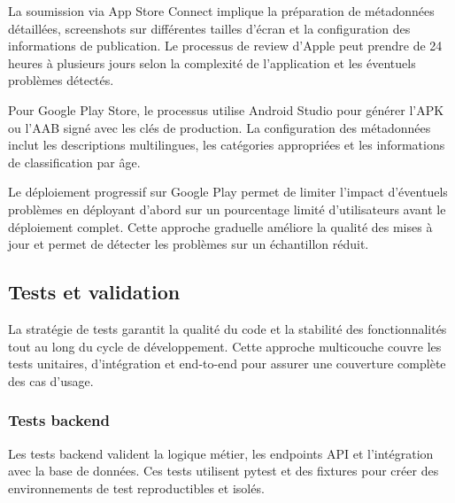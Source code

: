 La soumission via App Store Connect implique la préparation de métadonnées détaillées, screenshots sur différentes tailles d'écran et la configuration des informations de publication. Le processus de review d'Apple peut prendre de 24 heures à plusieurs jours selon la complexité de l'application et les éventuels problèmes détectés.

Pour Google Play Store, le processus utilise Android Studio pour générer l'APK ou l'AAB signé avec les clés de production. La configuration des métadonnées inclut les descriptions multilingues, les catégories appropriées et les informations de classification par âge.

Le déploiement progressif sur Google Play permet de limiter l'impact d'éventuels problèmes en déployant d'abord sur un pourcentage limité d'utilisateurs avant le déploiement complet. Cette approche graduelle améliore la qualité des mises à jour et permet de détecter les problèmes sur un échantillon réduit.

\subsection{Tests et validation}

La stratégie de tests garantit la qualité du code et la stabilité des fonctionnalités tout au long du cycle de développement. Cette approche multicouche couvre les tests unitaires, d'intégration et end-to-end pour assurer une couverture complète des cas d'usage.

\subsubsection{Tests backend}

Les tests backend valident la logique métier, les endpoints API et l'intégration avec la base de données. Ces tests utilisent pytest et des fixtures pour créer des environnements de test reproductibles et isolés.

